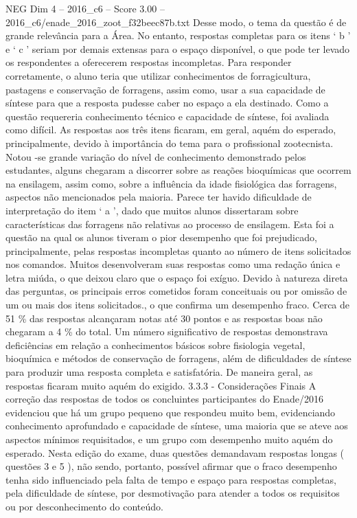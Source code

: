 \begin{textsample}{NEG Dim 4 – 2016\_c6 – Score 3.00 – 2016\_c6/enade\_2016\_zoot\_f32beec87b.txt}
Desse modo, o tema da questão é de grande relevância para a Área.
No entanto, respostas completas para os itens ‘ b ’ e ‘ c ’ seriam por demais extensas para o espaço disponível, o que pode ter levado os respondentes a oferecerem respostas incompletas.
Para responder corretamente, o aluno teria que utilizar conhecimentos de forragicultura, pastagens e conservação de forragens, assim como, usar a sua capacidade de síntese para que a resposta pudesse caber no espaço a ela destinado.
Como a questão requereria conhecimento técnico e capacidade de síntese, foi avaliada como difícil.
As respostas aos três itens ficaram, em geral, aquém do esperado, principalmente, devido à importância do tema para o profissional zootecnista.
Notou -se grande variação do nível de conhecimento demonstrado pelos estudantes, alguns chegaram a discorrer sobre as reações bioquímicas que ocorrem na ensilagem, assim como, sobre a influência da idade fisiológica das forragens, aspectos não mencionados pela maioria.
Parece ter havido dificuldade de interpretação do item ‘ a ’, dado que muitos alunos dissertaram sobre características das forragens não relativas ao processo de ensilagem.
Esta foi a questão na qual os alunos tiveram o pior desempenho que foi prejudicado, principalmente, pelas respostas incompletas quanto ao número de itens solicitados nos comandos.
Muitos desenvolveram suas respostas como uma redação única e letra miúda, o que deixou claro que o espaço foi exíguo.
Devido à natureza direta das perguntas, os principais erros cometidos foram conceituais ou por omissão de um ou mais dos itens solicitados., o que confirma um desempenho fraco.
Cerca de 51 \% das respostas alcançaram notas até 30 pontos e as respostas boas não chegaram a 4 \% do total.
Um número significativo de respostas demonstrava deficiências em relação a conhecimentos básicos sobre fisiologia vegetal, bioquímica e métodos de conservação de forragens, além de dificuldades de síntese para produzir uma resposta completa e satisfatória.
De maneira geral, as respostas ficaram muito aquém do exigido. 3.3.3 - Considerações Finais A correção das respostas de todos os concluintes participantes do Enade/2016 evidenciou que há um grupo pequeno que respondeu muito bem, evidenciando conhecimento aprofundado e capacidade de síntese, uma maioria que se ateve aos aspectos mínimos requisitados, e um grupo com desempenho muito aquém do esperado.
Nesta edição do exame, duas questões demandavam respostas longas ( questões 3 e 5 ), não sendo, portanto, possível afirmar que o fraco desempenho tenha sido influenciado pela falta de tempo e espaço para respostas completas, pela dificuldade de síntese, por desmotivação para atender a todos os requisitos ou por desconhecimento do conteúdo.

\end{textsample}
